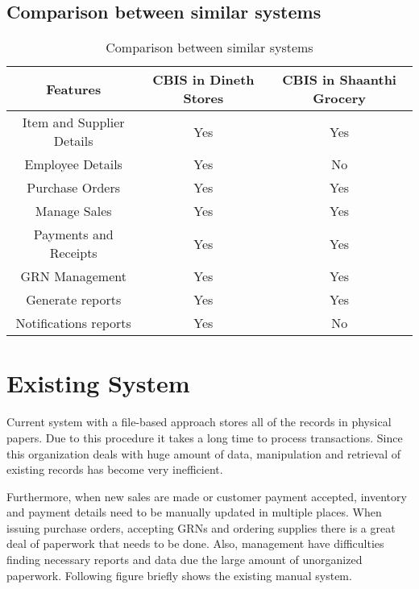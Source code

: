 \documentclass[12pt]{report}
\begin{document}
\subsection{Comparison between similar systems}
\begin{table}[H]
	\centering
	\begin{tabular}{ |c|c|c| }
		\hline
		\bf{Features}             & \bf{CBIS in Dineth Stores} & \bf{CBIS in Shaanthi Grocery} \\
		\hline
		Item and Supplier Details & Yes                        & Yes                           \\
		\hline
		Employee Details          & Yes                        & No                            \\
		\hline
		Purchase Orders           & Yes                        & Yes                           \\
		\hline
		Manage Sales              & Yes                        & Yes                           \\
		\hline
		Payments and Receipts     & Yes                        & Yes                           \\
		\hline
		GRN Management            & Yes                        & Yes                           \\
		\hline
		Generate reports          & Yes                        & Yes                           \\
		\hline
		Notifications reports     & Yes                        & No                            \\
		\hline
	\end{tabular}
	\caption{Comparison between similar systems}
\end{table}

\section{Existing System}
Current system with a file-based approach stores all of the records in physical papers. Due to this procedure it takes a long time to process transactions. Since this organization deals with huge amount of data, manipulation and retrieval of existing records has become very inefficient.

Furthermore, when new sales are made or customer payment accepted, inventory and payment details need to be manually updated in multiple places. When issuing purchase orders, accepting GRNs and ordering supplies there is a great deal of paperwork that needs to be done. Also, management have difficulties finding  necessary reports and data due the large amount of unorganized paperwork. Following figure briefly shows the existing manual system.
\end{document}

